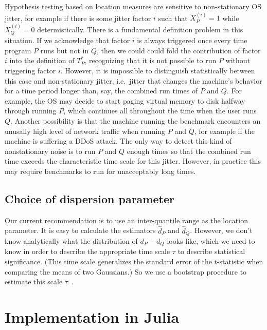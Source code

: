 \documentclass[conference]{IEEEtran}
\begin{document}
Hypothesis testing based on location measures are sensitive to non-stationary OS jitter, for example if there is some jitter factor $i$ such that $X^{(i)}_P = 1$ while $X^{(i)}_Q = 0$ determistically. There is a fundamental definition problem in this situation. If we acknowledge that factor $i$ is always triggered once every time program $P$ runs but not in $Q$, then we could could fold the contribution of factor $i$ into the definition of $T^*_P$, recognizing that it is not possible to run $P$ without triggering factor $i$. However, it is impossible to distinguish statistically between this case and non-stationary jitter, i.e.\ jitter that changes the machine's behavior for a time period longer than, say, the combined run times of $P$ and $Q$. For example, the OS may decide to start paging virtual memory to disk halfway through running $P$, which continues all throughout the time when the user runs $Q$. Another possibility is that the machine running the benchmark encounters an unusally high level of network traffic when running $P$ and $Q$, for example if the machine is suffering a DDoS attack. The only way to detect this kind of nonstationary noise is to run $P$ and $Q$ enough times so that the combined run time exceeds the characteristic time scale for this jitter. However, in practice this may require benchmarks to run for unacceptably long times.


\subsection{Choice of dispersion parameter}

Our current recommendation is to use an inter-quantile range as the location parameter. It is easy to calculate the estimators $\hat d_P$ and $\hat d_Q$. However, we don't know analytically what the distribution of $d_P - d_Q$ looks like, which we need to know in order to describe the appropriate time scale $\tau$ to describe statistical significance. (This time scale generalizes the standard error of the $t$-statistic when comparing the means of two Gaussians.) So we use a bootstrap procedure to estimate this scale $\tau$~\cite{Chernick2008}.



\section{Implementation in Julia}
\end{document}
